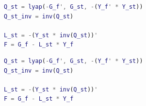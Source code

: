 \documentclass[a4paper,12pt]{article}
\begin{document}
\begin{lstlisting}[caption={Поиск \(L_{st}\) и \(F\)}, label={lst:LF}, language=matlab]
Q_st = lyap(-G_f', G_st, -(Y_f' * Y_st))
Q_st_inv = inv(Q_st)

L_st = -(Y_st * inv(Q_st))'
F = G_f - L_st * Y_f
\end{lstlisting}


\begin{lstlisting}[caption={Поиск \(Q_{st}\) и \(Q^-1_{st}\)}, label={lst:Q3}, language=matlab]
Q_st = lyap(-G_f', G_st, -(Y_f' * Y_st))
Q_st_inv = inv(Q_st)

L_st = -(Y_st * inv(Q_st))'
F = G_f - L_st * Y_f
\end{lstlisting}
	
\end{document}
